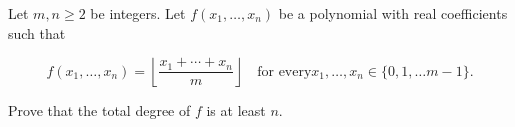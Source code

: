 Let $m, n \ge 2$ be integers. Let $f(x_1, \dots, x_n)$ be a polynomial with real coefficients such that

$$f(x_1, \dots, x_n) = \left \lfloor{\dfrac{x_1 + \cdots + x_n}{m}}\right \rfloor \quad \text{for every} x_1, \dots, x_n \in \{0, 1, \dots m-1\}.$$

Prove that the total degree of $f$ is at least $n$.